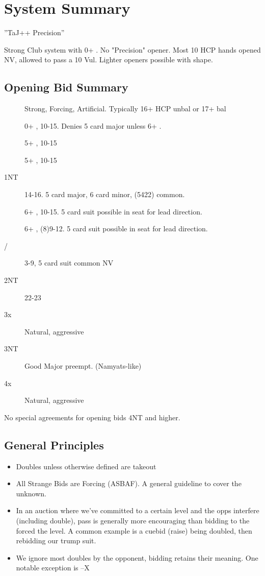 \documentclass[tom-ari]{subfile}
\begin{document}
	
\chapter{System Summary}


''TaJ++ Precision'' %

Strong Club system with 0+ .  No "Precision"  opener.  Most 10 HCP hands opened NV, allowed to pass a 10 Vul. Lighter openers possible with shape.  

\section{Opening Bid Summary}

\begin{description}
	\item[] Strong, Forcing, Artificial.  Typically 16+ HCP unbal or 17+ bal
	\item[] 0+ \diamondsuit, 10-15.  Denies 5 card major unless 6+ \diamondsuit.
	\item[] 5+ \heartsuit, 10-15
	\item[] 5+ \spadesuit, 10-15
	\item[1NT] 14-16.  5 card major, 6 card minor, (5422) common.
	\item[] 6+ \clubsuit, 10-15.  5 card suit possible in \third seat for lead direction.
	\item[] 6+ \diamondsuit, (8)9-12.  5 card suit possible in \third seat for lead direction.
	\item[/] 3-9, 5 card suit common NV
	\item[2NT] 22-23
	\item[3x] Natural, aggressive
	\item[3NT] Good Major preempt.  (Namyats-like)
	\item[4x] Natural, aggressive
\end{description}

No special agreements for opening bids 4NT and higher.

\section{General Principles}

\begin{itemize}
	\item Doubles unless otherwise defined are takeout
	\item All Strange Bids are Forcing (ASBAF).  A general guideline to cover the unknown.
	\item In an auction where we've committed to a certain level and the opps interfere (including double), pass is generally more encouraging than bidding to the forced the level.  A common example is a cuebid (raise) being doubled, then rebidding our trump suit.
	\item We ignore most doubles by the opponent, bidding retains their meaning.  One notable exception is --X
\end{itemize}	
\end{document}
